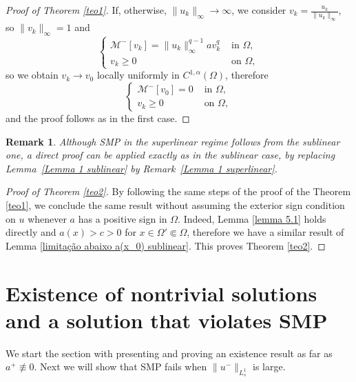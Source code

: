 \documentclass[11pt]{article}
\newtheorem{rem}{Remark}
\begin{document}
\begin{proof}[Proof of Theorem \ref{teo1}]
If, otherwise, $\| u_{k}\|_{\infty} \rightarrow\infty$, we consider $v_k=\frac{u_k}{\| u_{k}\|_{\infty}}$, so $\| v_{k}\|_{\infty}= 1$ and
 \begin{equation*}
    \begin{cases}
    \mathcal{M}^{-}[v_k] =\| u_{k}\|_{\infty}^{q-1}av_k^q & \text{ in } \Omega, \\ 
    v_k\geq0 & \text{ on }\Omega,
    \end{cases}
\end{equation*}
so we obtain \(v_{k} \to v_{0}\) locally uniformly in \(C^{1,\alpha}(\Omega)\), therefore
 \begin{equation*}
    \begin{cases}
    \mathcal{M}^{-}[v_0] =0 & \text{ in } \Omega, \\ 
    v_k\geq0 & \text{ on }\Omega,
    \end{cases}
\end{equation*}
and the proof follows as in the first case.
\end{proof}

\begin{rem}
Although SMP in the superlinear regime follows from the sublinear one, a direct proof can be applied exactly as in the sublinear case, by replacing  Lemma~\ref{Lemma 1 sublinear} by Remark~\ref{Lemma 1 superlinear}.
\end{rem}

\begin{proof}[Proof of Theorem \ref{teo2}]
By following the same steps of the proof of the Theorem \ref{teo1}, we conclude the same result without assuming the exterior sign condition on $u$ whenever $a$ has a positive sign in $\Omega$. Indeed, Lemma \ref{lemma 5.1} holds directly and  $a(x)>c>0$ for $x\in \Omega'\Subset \Omega$, therefore we have a similar result of Lemma \ref{limitação abaixo a(x_0) sublinear}. This proves Theorem \ref{teo2}.
\end{proof}




\section{Existence of nontrivial solutions and a solution that violates SMP}


We start the section with presenting and proving an existence result as far as $a^+\not\equiv 0$. Next we will show that SMP fails when \(\|u^-\|_{L^1_s}\) is large.
\end{document}

